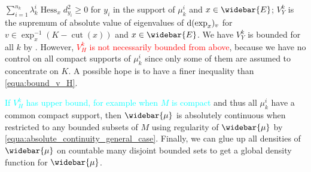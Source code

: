 $ \sum_{i=1}^{n_k} \lambda_k^i \operatorname{Hess}_x d^2_{y_i} \geq 0$
for $y_i$ in the support of $\mu_k^i$ and $x \in \widebar{E} $;
$V_Y^k$ is the supremum of absolute value of eigenvalues of $\operatorname{d} (\exp_x)_v $
for $v \in \exp_x^{-1}(K - \operatorname{cut}(x))$ and $x \in \widebar{E}$.
We have $V_Y^k$ is bounded for all $k$ by .
However, \textcolor{red}{$V_H^k$ is not necessarily bounded from above},
because we have no control on all compact supports of $\mu_k^i$
since only some of them are assumed to concentrate on $K$.
A possible hope is to have a finer inequality than \cref{equa:bound_v_H}.

\textcolor{cyan}{If $V_H^k$ has upper bound,
for example when $M$ is compact} and thus all $\mu_k^i$ have a common compact support,
then $\widebar{\mu}$ is absolutely continuous when restricted to any bounded subsets of $M$
using regularity of $\widebar{\mu}$ by \cref{equa:absolute_continuity_general_case}.
Finally, we can glue up all densities of $\widebar{\mu}$ on
countable many disjoint bounded sets to get a global density function for $\widebar{\mu}$.


